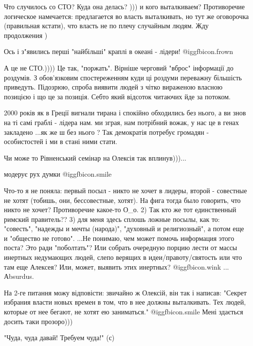\begin{itemize}
Что случилось со СТО? Куда она делась? ))) и кого выталкиваем? Противоречие
логическое намечается: предлагается во власть выталкивать, но тут же оговорочка
(правильная кстати), что власть не по плечу случайным людям. Жду продолжения )


Ось і з"явились перші "найбільші" краплі в океані - лідери!  @igg{fbicon.frown} 


А це не СТО.)))) Це так, "поржать". Вірніше черговий "вброс" інформації до
роздумів. З обов'язковим спостереженням куди ці роздуми переважну більшість
приведуть. Підозрюю, спроба виявити людей з чітко вираженою власною позицією і
що це за позиція. Себто який відсоток читаючих йде за потоком.



2000 років як в Греції вигнали тирана і спокійно обходились без нього, а ви
знов на ті самі граблі - лідера нам. ми зграя, нам потрібний вожак, у нас це
в генах закладено ...як же ш без нього ? Так демократія потребує громадян -
особистостей і ми в стані ними стати.

Чи може то Рівненський семінар на Олексія так вплинув)))...

модерує рух думки  @igg{fbicon.smile} 


Что-то я не поняла: первый посыл - никто не хочет в лидеры, второй - совестные
не хотят (тобишь, они, бессовестные, хотят). На фига тогда было говорить, что
никто не хочет? Противоречие какое-то О_о. 2) Так кто же тот единственный
римский правитель?? 3) для меня здесь сплошь ложные посылы, как то: "совесть",
"надежды и мечты (народа)", "духовный и религиозный", а потом еще и "общество
не готово". ...Не понимаю, чем может помочь информация этого поста? Это ради
"поболтать"? Или собрать очередную порцию лести от массы инертных недумающих
людей, слепо верящих в идеи/правоту/святость или что там еще Алексея? Или,
может, выявить этих инертных?  @igg{fbicon.wink}  ... Аbsurdus.


На 2-ге питання можу відповісти: звичайно ж Олексій, він так і написав: "Секрет
избрания власти новых времен в том, что в нее должны выталкивать. Тех людей,
которые от нее бегают, не хотят ею заниматься."  @igg{fbicon.smile}  Мені здається досить таки
прозоро)))


"Чуда, чуда давай! Требуем чуда!" (с)

\end{itemize} %
